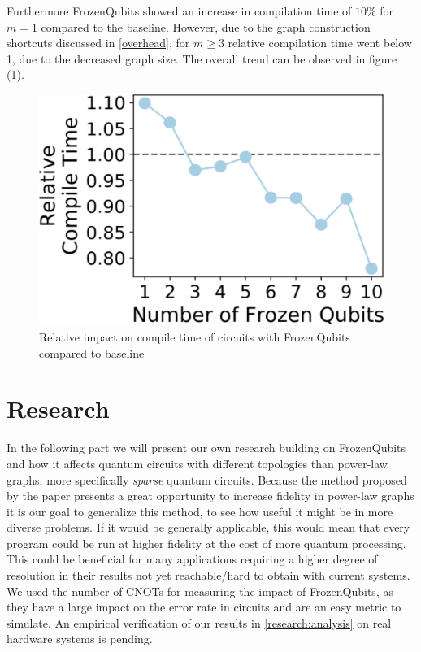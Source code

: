 Furthermore FrozenQubits showed an increase in compilation time of $10\%$ for $m=1$ compared to the baseline. However, due to the graph construction shortcuts discussed in \ref{overhead}, for $m\geq 3$ relative compilation time went below 1, due to the decreased graph size. The overall trend can be observed in figure (\ref{fig:compilation}).
\begin{figure}[H]
    \centering
    \includegraphics[width=0.5\linewidth]{Results/Results_Compilation.png}
    \caption{Relative impact on compile time of circuits with FrozenQubits compared to baseline}
    \label{fig:compilation}
\end{figure}
\section{Research}
In the following part we will present our own research building on FrozenQubits and how it affects quantum circuits with different topologies than power-law graphs, more specifically \emph{sparse} quantum circuits. Because the method proposed by the paper presents a great opportunity to increase fidelity in power-law graphs it is our goal to generalize this method, to see how useful it might be in more diverse problems. If it would be generally applicable, this would mean that every program could be run at higher fidelity at the cost of more quantum processing. This could be beneficial for many applications requiring a higher degree of resolution in their results not yet reachable/hard to obtain with current systems. We used the number of CNOTs for measuring the impact of FrozenQubits, as they have a large impact on the error rate in circuits and are an easy metric to simulate. An empirical verification of our results in \ref{research:analysis} on real hardware systems is pending.
